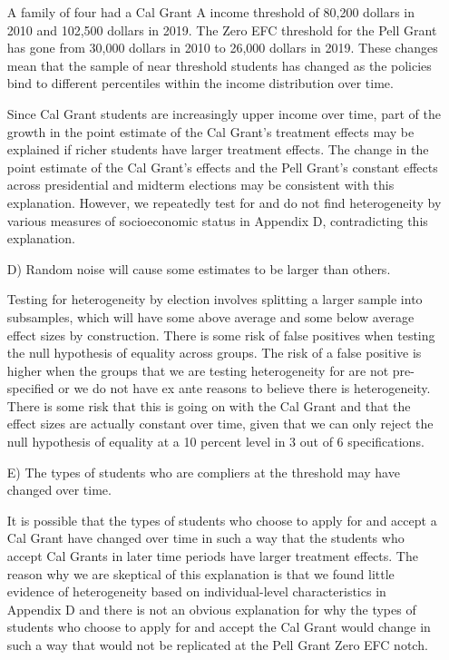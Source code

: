 \documentclass[12pt,letterpaper,oneside]{book}
\begin{document}
\begin{itemize}
A family of four had a Cal Grant A income threshold of 80,200 dollars in 2010 and 102,500 dollars in 2019. The Zero EFC threshold for the Pell Grant has gone from 30,000 dollars in 2010 to 26,000 dollars in 2019. These changes mean that the sample of near threshold students has changed as the policies bind to different percentiles within the income distribution over time.

Since Cal Grant students are increasingly upper income over time, part of the growth in the point estimate of the Cal Grant's treatment effects may be explained if richer students have larger treatment effects. The change in the point estimate of the Cal Grant’s effects and the Pell Grant's constant effects across presidential and midterm elections may be  consistent with this explanation. However, we repeatedly test for and do not find heterogeneity by various measures of socioeconomic status in Appendix D, contradicting this explanation.

\item[D)] Random noise will cause some estimates to be larger than others.

Testing for heterogeneity by election involves splitting a larger sample into subsamples, which will have some above average and some below average effect sizes by construction. There is some risk of false positives when testing the null hypothesis of equality across groups. The risk of a false positive is higher when the groups that we are testing heterogeneity for are not pre-specified or we do not have ex ante reasons to believe there is heterogeneity. There is some risk that this is going on with the Cal Grant and that the effect sizes are actually constant over time, given that we can only reject the null hypothesis of equality at a 10 percent level in 3 out of 6 specifications.

\item[E)] The types of students who are compliers at the threshold may have changed over time.

It is possible that the types of students who choose to apply for and accept a Cal Grant have changed over time in such a way that the students who accept Cal Grants in later time periods have larger treatment effects. The reason why we are skeptical of this explanation is that we found little evidence of heterogeneity based on individual-level characteristics in Appendix D and there is not an obvious explanation for why the types of students who choose to apply for and accept the Cal Grant would change in such a way that would not be replicated at the Pell Grant Zero EFC notch.
\end{itemize}
\end{document}
